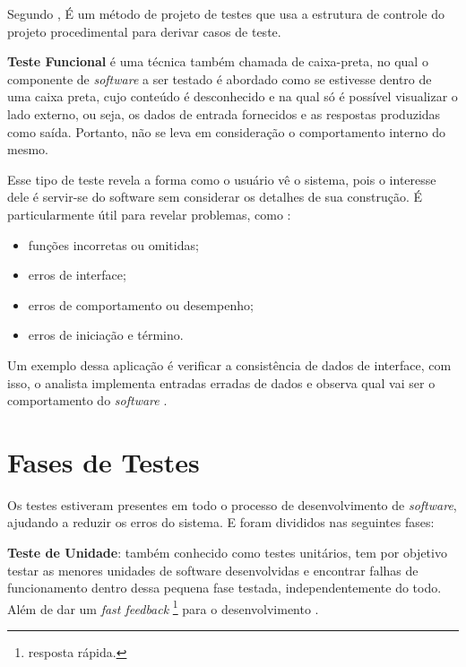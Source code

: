 \par Segundo , É um método de projeto de testes que usa a estrutura de controle do projeto procedimental para derivar casos de teste.

 \textbf{Teste Funcional} é uma técnica também chamada de caixa-preta, no qual o componente de \textit{software} a ser testado é abordado como se estivesse dentro de uma caixa preta, cujo conteúdo é desconhecido e na qual só é possível visualizar o lado externo, ou seja, os dados de entrada fornecidos e as respostas produzidas como saída. Portanto, não se leva em consideração o comportamento interno do mesmo.
 
 \par Esse tipo de teste revela a forma como o usuário vê o sistema, pois o interesse dele é servir-se do software sem considerar os detalhes de sua construção. É particularmente útil para revelar problemas, como :
 
 \begin{itemize}
     \item funções incorretas ou omitidas;
     \item erros de interface;
     \item erros de comportamento ou desempenho;
     \item erros de iniciação e término.
 \end{itemize}

 
\par Um exemplo dessa aplicação é verificar a consistência de dados de interface, com isso, o analista implementa entradas erradas de dados e observa qual vai ser o comportamento do \textit{software} \cite{qualidade}.



\section{Fases de Testes}

\par Os testes estiveram presentes em todo o processo de desenvolvimento de \textit{software}, ajudando a reduzir os erros do sistema. E foram divididos nas seguintes fases:

 \textbf{Teste de Unidade}: também conhecido como testes unitários, tem por objetivo testar as menores unidades de software desenvolvidas e encontrar falhas de funcionamento dentro dessa pequena fase testada, independentemente do todo. Além de dar um \textit{fast feedback} \footnote{resposta rápida.} para o desenvolvimento \cite{unidade}.
    
